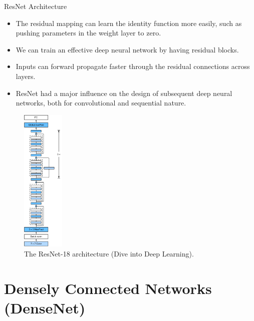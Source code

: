   \framebreak


\begin{vbframe}{ResNet Architecture}
    \begin{itemize}
        \item The residual mapping can learn the identity function more easily, such as pushing parameters in the weight layer to zero.
        \item We can train an effective deep neural network by having residual blocks.
        \item Inputs can forward propagate faster through the residual connections across layers.
        \item ResNet had a major influence on the design of subsequent deep neural networks, both for convolutional and sequential nature.
    \end{itemize}
    
     \begin{figure}
  \centering
    \includegraphics[width=2cm]{plots/moderncnn/resnet18.png}
    \caption{The ResNet-18 architecture (Dive into Deep Learning).}
  \end{figure}
  
 \end{vbframe}

\section{Densely Connected Networks (DenseNet)}

